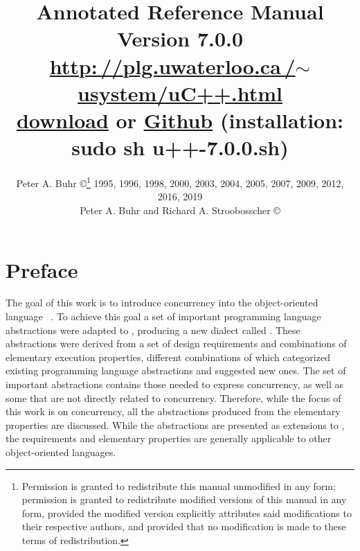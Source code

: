 \documentclass[openright,twoside]{report}
\newcommand{\Version}{7.0.0}
\begin{document}

\pagestyle{headings}

\title{\huge \bf
\uC Annotated Reference Manual \\
\vspace{1in}
\LARGE Version \Version \\
\vspace{1in}
\href{http://plg.uwaterloo.ca/~usystem/uC++.html}{\textsf{http:\,//\hspace{0.1ex}plg.uwaterloo.ca\,/$\sim$usystem/uC++.html}} \\
\vspace{0.125in}
\href{http://plg.uwaterloo.ca/~usystem/pub/uSystem/u++-7.0.0.sh}{\uC download} or \href{https://github.com/pabuhr/uCPP}{Github} (installation: \textsf{sudo sh u++-7.0.0.sh}) \\
} %
\author{
\large Peter A. Buhr \copyright\thanks{\normalsize
Permission is granted to redistribute this manual unmodified in any form;
permission is granted to redistribute modified versions of this	manual in any form, provided the modified version explicitly attributes said modifications to their respective authors, and provided that no modification is made to these terms of redistribution.
} 1995, 1996, 1998, 2000, 2003, 2004, 2005, 2007, 2009, 2012, 2016, 2019 \\
Peter A. Buhr and Richard A. Stroobosscher \copyright{} \\
} %

\maketitle
\thispagestyle{empty}				%
\cleardoublepage					%
\tableofcontents
\cleardoublepage					%


\chapter*{Preface}

The goal of this work is to introduce concurrency into the object-oriented language \CC~\cite{C++:V3}.
To achieve this goal a set of important programming language abstractions were adapted to \CC, producing a new dialect called \uC.
These abstractions were derived from a set of design requirements and combinations of elementary execution properties, different combinations of which categorized existing programming language abstractions and suggested new ones.
The set of important abstractions contains those needed to express concurrency, as well as some that are not directly related to concurrency.
Therefore, while the focus of this work is on concurrency, all the abstractions produced from the elementary properties are discussed.
While the abstractions are presented as extensions to \CC, the requirements and elementary properties are generally applicable to other object-oriented languages.
\end{document}

